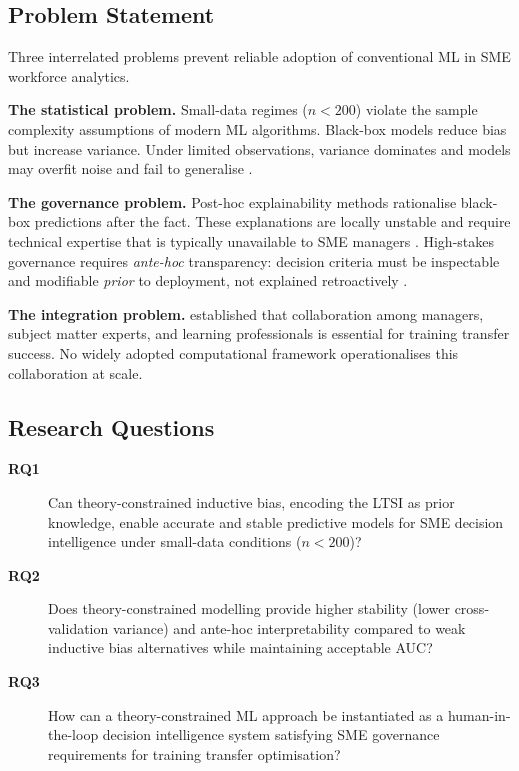 \documentclass[11pt,a4paper]{article}
\begin{document}
\subsection{Problem Statement}

Three interrelated problems prevent reliable adoption of conventional ML in SME workforce analytics.

\textbf{The statistical problem.} Small-data regimes ($n < 200$) violate the sample complexity assumptions of modern ML algorithms. Black-box models reduce bias but increase variance. Under limited observations, variance dominates and models may overfit noise and fail to generalise \citep{hardt2021, vapnik1998}.

\textbf{The governance problem.} Post-hoc explainability methods rationalise black-box predictions after the fact. These explanations are locally unstable and require technical expertise that is typically unavailable to SME managers \citep{cigi2023}. High-stakes governance requires \emph{ante-hoc} transparency: decision criteria must be inspectable and modifiable \emph{prior} to deployment, not explained retroactively \citep{rudin2019}.

\textbf{The integration problem.} \citet{mughal2023} established that collaboration among managers, subject matter experts, and learning professionals is essential for training transfer success. No widely adopted computational framework operationalises this collaboration at scale.

\subsection{Research Questions}

\begin{description}
  \item[\textbf{RQ1}] Can theory-constrained inductive bias, encoding the LTSI as prior knowledge, enable accurate and stable predictive models for SME decision intelligence under small-data conditions ($n < 200$)?
  \item[\textbf{RQ2}] Does theory-constrained modelling provide higher stability (lower cross-validation variance) and ante-hoc interpretability compared to weak inductive bias alternatives while maintaining acceptable AUC?
  \item[\textbf{RQ3}] How can a theory-constrained ML approach be instantiated as a human-in-the-loop decision intelligence system satisfying SME governance requirements for training transfer optimisation?
\end{description}
\end{document}
